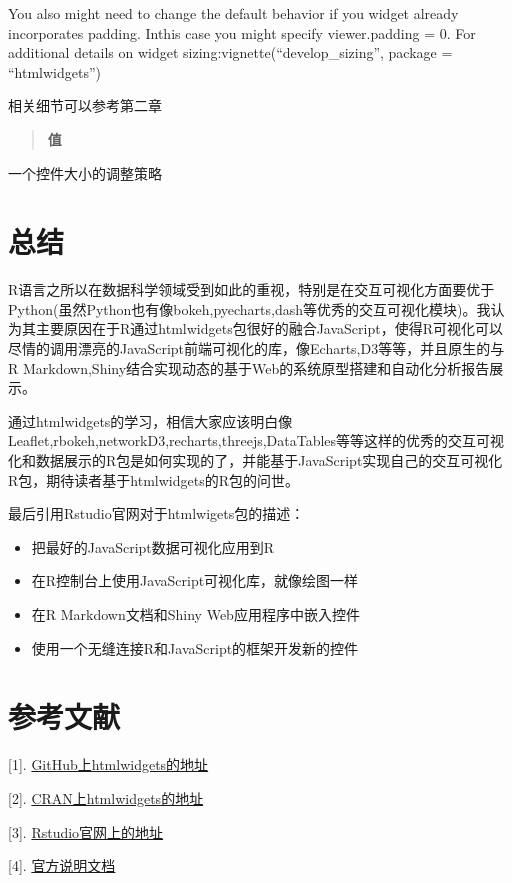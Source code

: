 \documentclass[]{book}
\theoremstyle{definition}
\theoremstyle{definition}
\theoremstyle{definition}
\theoremstyle{remark}
\begin{document}
You also might need to change the default behavior if you widget already
incorporates padding. Inthis case you might specify viewer.padding = 0.
For additional details on widget sizing:vignette(``develop\_sizing'',
package = ``htmlwidgets'')

相关细节可以参考第二章

\begin{quote}
\textbf{值}
\end{quote}

一个控件大小的调整策略

\chapter{总结}\label{summary}

R语言之所以在数据科学领域受到如此的重视，特别是在交互可视化方面要优于Python(虽然Python也有像bokeh,pyecharts,dash等优秀的交互可视化模块)。我认为其主要原因在于R通过htmlwidgets包很好的融合JavaScript，使得R可视化可以尽情的调用漂亮的JavaScript前端可视化的库，像Echarts,D3等等，并且原生的与R
Markdown,Shiny结合实现动态的基于Web的系统原型搭建和自动化分析报告展示。

通过htmlwidgets的学习，相信大家应该明白像Leaflet,rbokeh,networkD3,recharts,threejs,DataTables等等这样的优秀的交互可视化和数据展示的R包是如何实现的了，并能基于JavaScript实现自己的交互可视化R包，期待读者基于htmlwidgets的R包的问世。

最后引用Rstudio官网对于htmlwigets包的描述：

\begin{itemize}
\item
  把最好的JavaScript数据可视化应用到R
\item
  在R控制台上使用JavaScript可视化库，就像绘图一样
\item
  在R Markdown文档和Shiny Web应用程序中嵌入控件
\item
  使用一个无缝连接R和JavaScript的框架开发新的控件
\end{itemize}

\chapter{参考文献}\label{reference}

{[}1{]}.
\href{https://github.com/ramnathv/htmlwidgets}{GitHub上htmlwidgets的地址}

{[}2{]}.
\href{https://CRAN.R-project.org/package=htmlwidgets}{CRAN上htmlwidgets的地址}

{[}3{]}. \href{https://www.htmlwidgets.org/}{Rstudio官网上的地址}

{[}4{]}.
\href{https://cran.r-project.org/web/packages/htmlwidgets/htmlwidgets.pdf}{官方说明文档}


\end{document}
